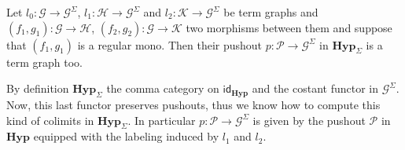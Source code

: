 \documentclass[runningheads,envcountsect]{lmcs}
\newcommand{\hyp}{\catname{Hyp}}
\newcommand{\catname}[1]{\mathbf{#1}}
\newcommand{\id}[1]{\mathsf{id}_{#1}}
\theoremstyle{plain}
\theoremstyle{definition}
\begin{document}
\begin{prop}\label{prop:push}
	Let $l_0:\mathcal{G}\to \mathcal{G}^{\Sigma}$, $l_1:\mathcal{H}\to \mathcal{G}^{\Sigma}$ and $l_2:\mathcal{K}\to \mathcal{G}^{\Sigma}$ be term graphs and $(f_1, g_1):\mathcal{G}\to \mathcal{H}$, $(f_2, g_2):\mathcal{G}\to \mathcal{K}$ two morphisms between them and suppose that $(f_1, g_1)$ is a regular mono. Then their pushout $p:\mathcal{P}\to \mathcal{G}^{\Sigma}$ in $\hyp_{\Sigma}$ is a term graph too.
\end{prop}
\begin{rem}
By definition $\hyp_{\Sigma}$  the comma category on $\id{\hyp}$ and the costant functor in $\mathcal{G}^\Sigma$. Now, this last functor preserves pushouts, thus we know how to compute this kind of colimits in $\hyp_{\Sigma}$. In particular $p:\mathcal{P}\to \mathcal{G}^{\Sigma}$ is given by the pushout $\mathcal{P}$ in $\hyp$ equipped with the labeling induced by $l_1$ and $l_2$.
\end{rem}
\end{document}
